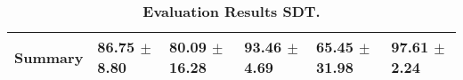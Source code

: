 \begin{table}[htb]
{\begin{tabular}{llllll}
\midrule
\textbf{Summary                                  } &        \phantom{0}86.75 $\pm$ \phantom{0}8.80 &                      \phantom{0}80.09 $\pm$ 16.28 &        \phantom{0}93.46 $\pm$ \phantom{0}4.69 &            \phantom{0}65.45 $\pm$ 31.98 &  \phantom{0}97.61 $\pm$ \phantom{0}2.24 \\
\bottomrule
\end{tabular}%
}
\caption{\textbf{Evaluation Results SDT.}}
\label{tab:eval-results}
\end{table}
\newpage 
